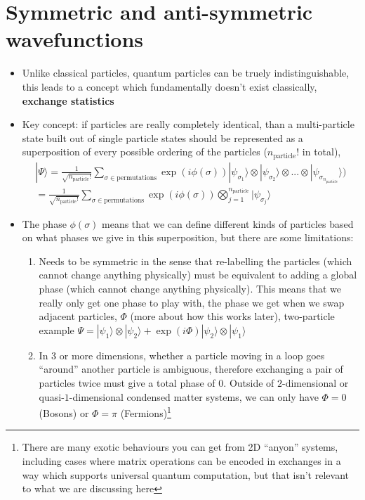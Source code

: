 \documentclass[english]{article}
\newcommand{\ket}[1]{|#1 \rangle}
\begin{document}
\section{Symmetric and anti-symmetric wavefunctions}
\begin{itemize}
\item Unlike classical particles, quantum particles can be truely indistinguishable, this leads to a concept which fundamentally doesn't exist classically, \textbf{exchange statistics}
\item Key concept: if particles are really completely identical, than a multi-particle state built out of single particle states should be represented as a superposition of every possible ordering of the particles ($n_{\mathrm{particle}}!$ in total),
\begin{align}
\ket{\Psi}=\frac{1}{\sqrt{n_{\mathrm{particle}}!}}\sum_{\sigma \in \mathrm{permutations}}\exp(i\phi(\sigma))\ket{\psi_{\sigma_1}}\otimes\ket{\psi_{\sigma_2}}\otimes... \otimes\ket{\psi_{\sigma_{n_{\mathrm{particle}}}}}) \\=\frac{1}{\sqrt{n_{\mathrm{particle}}!}}\sum_{\sigma \in \mathrm{permutations}}\exp(i\phi(\sigma))\bigotimes^{n_{\mathrm{particle}}}_{j=1}  \ket{\psi_{\sigma_j}}\label{eq:permute_sum}
\end{align}
\item The phase $\phi(\sigma)$ means that we can define different kinds of particles based on what phases we give in this superposition, but there are some limitations:
\begin{enumerate}
\item Needs to be symmetric in the sense that re-labelling the particles (which cannot change anything physically) must be equivalent to adding a global phase (which cannot change anything physically). This means that we really only get one phase to play with, the phase we get when we swap adjacent particles, $\Phi$ (more about how this works later), two-particle example $\Psi=\ket{\psi_1}\otimes\ket{\psi_2}+\exp(i\Phi) \ket{\psi_2}\otimes\ket{\psi_1}$
\item In $3$ or more dimensions, whether a particle moving in a loop goes ``around'' another particle is ambiguous, therefore exchanging a pair of particles twice must give a total phase of $0$. Outside of $2$-dimensional or quasi-$1$-dimensional  condensed matter systems, we can only have $\Phi=0$ (Bosons) or $\Phi=\pi$ (Fermions)\footnote{There are many exotic behaviours you can get from 2D ``anyon'' systems, including cases where matrix operations can be encoded in exchanges in a way which supports universal quantum computation, but that isn't relevant to what we are discussing here}

\end{enumerate}
\end{itemize}
\end{document}
